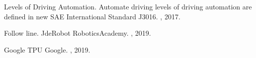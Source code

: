 \begin{thebibliography}{1}
Levels of Driving Automation.
\newblock Automate driving levels of driving automation are defined in new SAE International Standard J3016.
, 2017.

Follow line.
\newblock JdeRobot RoboticsAcademy.
, 2019.

Google TPU
\newblock Google.
, 2019.




\end{thebibliography}
